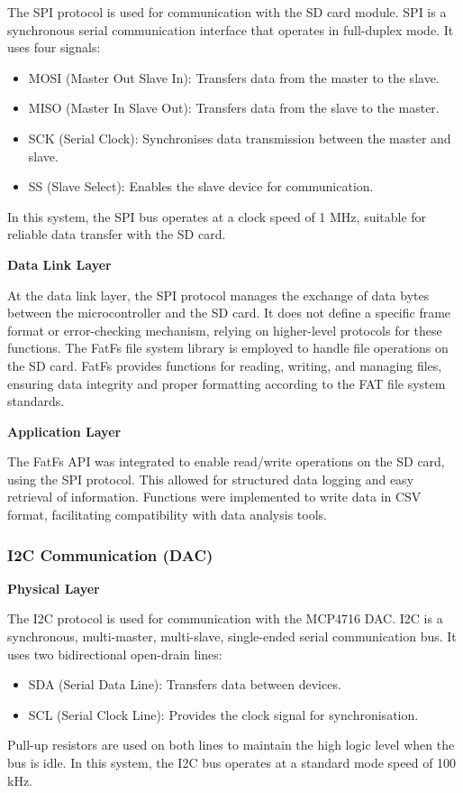 The SPI protocol is used for communication with the SD card module. SPI is a synchronous serial communication 
interface that operates in full-duplex mode. It uses four signals:
\begin{itemize}
    \item MOSI (Master Out Slave In): Transfers data from the master to the slave.
    \item MISO (Master In Slave Out): Transfers data from the slave to the master.
    \item SCK (Serial Clock): Synchronises data transmission between the master and slave.
    \item SS (Slave Select): Enables the slave device for communication.
\end{itemize}
In this system, the SPI bus operates at a clock speed of 1 MHz, suitable for reliable data transfer 
with the SD card.

\textbf{Data Link Layer}

At the data link layer, the SPI protocol manages the exchange of data bytes between the microcontroller 
and the SD card. It does not define a specific frame format or error-checking mechanism, relying on 
higher-level protocols for these functions. The FatFs file system library is employed to handle file 
operations on the SD card. FatFs provides functions for reading, writing, and managing files, ensuring 
data integrity and proper formatting according to the FAT file system standards.

\textbf{Application Layer}

The FatFs API was integrated to enable read/write operations on the SD card, 
using the SPI protocol. This allowed for structured data logging and easy retrieval of information. 
Functions were implemented to write data in CSV format, facilitating compatibility with data analysis tools.

\subsubsection{I2C Communication (DAC)}

\textbf{Physical Layer}

The I2C protocol is used for communication with the MCP4716 DAC. I2C is a synchronous, multi-master, 
multi-slave, single-ended serial communication bus. It uses two bidirectional open-drain lines:
\begin{itemize}
    \item SDA (Serial Data Line): Transfers data between devices.
    \item SCL (Serial Clock Line): Provides the clock signal for synchronisation.
\end{itemize}
Pull-up resistors are used on both lines to maintain the high logic level when the bus is idle. 
In this system, the I2C bus operates at a standard mode speed of 100 kHz.

